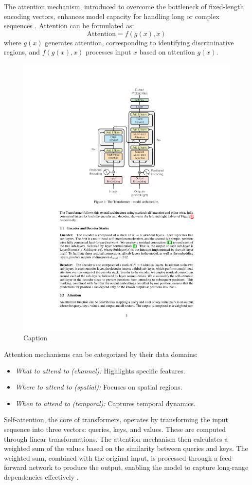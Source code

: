 The attention mechanism, introduced to overcome the bottleneck of fixed-length encoding vectors, enhances model capacity for handling long or complex sequences \cite{DBLP:journals/corr/VaswaniSPUJGKP17}. Attention can be formulated as:
\begin{equation}
\text{Attention} = f(g(x), x)
\end{equation}
where \( g(x) \) generates attention, corresponding to identifying discriminative regions, and \( f(g(x), x) \) processes input \( x \) based on attention \( g(x) \).
\begin{figure}[H]
    \centering
    \includegraphics[width=0.5\linewidth]{LateX/figs/attention_transformer_architecture.pdf}
    \caption{Caption}
    \label{fig:enter-label}
\end{figure}

Attention mechanisms can be categorized by their data domains:
\begin{itemize}
    \item \textit{What to attend to (channel):} Highlights specific features.
    \item \textit{Where to attend to (spatial):} Focuses on spatial regions.
    \item \textit{When to attend to (temporal):} Captures temporal dynamics.
\end{itemize}

Self-attention, the core of transformers, operates by transforming the input sequence into three vectors: queries, keys, and values. These are computed through linear transformations. The attention mechanism then calculates a weighted sum of the values based on the similarity between queries and keys. The weighted sum, combined with the original input, is processed through a feed-forward network to produce the output, enabling the model to capture long-range dependencies effectively \cite{ramachandran2019standalone}.

